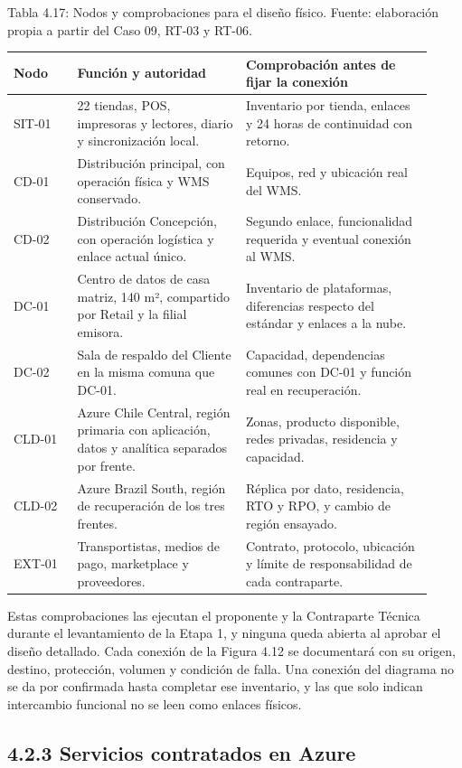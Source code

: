 \documentclass[11pt]{article}
\begin{document}
Tabla 4.17: Nodos y comprobaciones para el diseño físico. Fuente: elaboración propia a partir del Caso 09, RT-03 y RT-06.\par\nopagebreak
\begin{longtable}{@{}p{0.14\linewidth}p{0.37\linewidth}p{0.41\linewidth}@{}}
\toprule Nodo & Función y autoridad & Comprobación antes de fijar la conexión \\
\midrule\endhead\bottomrule\endlastfoot
SIT-01 & 22 tiendas, POS, impresoras y lectores, diario y sincronización local. & Inventario por tienda, enlaces y 24 horas de continuidad con retorno. \\
CD-01 & Distribución principal, con operación física y WMS conservado. & Equipos, red y ubicación real del WMS. \\
CD-02 & Distribución Concepción, con operación logística y enlace actual único. & Segundo enlace, funcionalidad requerida y eventual conexión al WMS. \\
DC-01 & Centro de datos de casa matriz, 140 m², compartido por Retail y la filial emisora. & Inventario de plataformas, diferencias respecto del estándar y enlaces a la nube. \\
DC-02 & Sala de respaldo del Cliente en la misma comuna que DC-01. & Capacidad, dependencias comunes con DC-01 y función real en recuperación. \\
CLD-01 & Azure Chile Central, región primaria con aplicación, datos y analítica separados por frente. & Zonas, producto disponible, redes privadas, residencia y capacidad. \\
CLD-02 & Azure Brazil South, región de recuperación de los tres frentes. & Réplica por dato, residencia, RTO y RPO, y cambio de región ensayado. \\
EXT-01 & Transportistas, medios de pago, marketplace y proveedores. & Contrato, protocolo, ubicación y límite de responsabilidad de cada contraparte. \\
\end{longtable}

Estas comprobaciones las ejecutan el proponente y la Contraparte Técnica durante el levantamiento de la Etapa 1, y ninguna queda abierta al aprobar el diseño detallado. Cada conexión de la Figura 4.12 se documentará con su origen, destino, protección, volumen y condición de falla. Una conexión del diagrama no se da por confirmada hasta completar ese inventario, y las que solo indican intercambio funcional no se leen como enlaces físicos.

\subsection{4.2.3 Servicios contratados en Azure}
\end{document}
